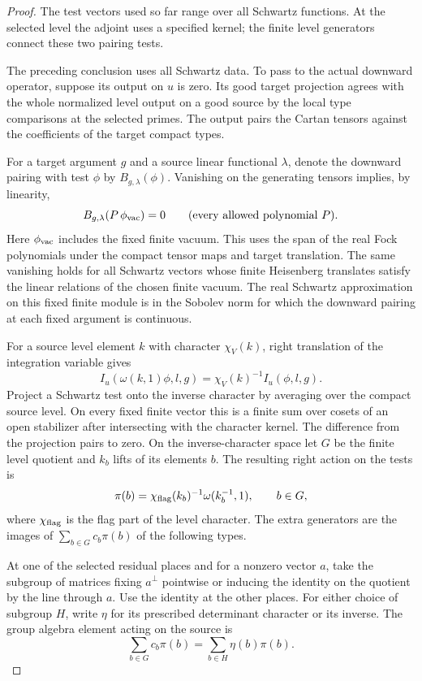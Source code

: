 \begin{proof}
The test vectors used so far range over all Schwartz functions. At the selected level the adjoint uses a specified kernel; the finite level generators connect these two pairing tests.

The preceding conclusion uses all Schwartz data. To pass
to the actual downward operator, suppose its output on
\(u\) is zero. Its good target projection agrees with the
whole normalized level output on a good source by the
local type comparisons at the selected primes. The
output pairs the Cartan tensors against the coefficients
of the target compact types.

For a target argument \(g\) and a source linear functional \(\lambda\), denote the downward pairing with test \(\phi\) by \(B_{g,\lambda}(\phi)\). Vanishing on the generating tensors implies, by linearity,
\[
 B_{g,\lambda}(P\,\phi_{\rm vac})=0\qquad(\text{every allowed polynomial }P).
\]
Here \(\phi_{\rm vac}\) includes the fixed finite vacuum.
This uses the span of the real Fock polynomials under the
compact tensor maps and target translation. The same
vanishing holds for all Schwartz vectors whose finite
Heisenberg translates satisfy the linear relations of
the chosen finite vacuum. The real Schwartz approximation
on this fixed finite module is in the Sobolev norm for
which the downward pairing at each fixed argument is
continuous.

For a source level element \(k\) with character \(\chi_V(k)\),
right translation of the integration variable gives
\[
 I_u(\omega(k,1)\phi,l,g)=\chi_V(k)^{-1}I_u(\phi,l,g).
\]
Project a Schwartz test onto the inverse character by
averaging over the compact source level. On every fixed
finite vector this is a finite sum over cosets of an open
stabilizer after intersecting with the character kernel.
The difference from the projection pairs to zero. On the
inverse-character space let \(G\) be the finite level
quotient and \(k_b\) lifts of its elements \(b\). The resulting right action on the tests is
\[
 \pi(b)=\chi_{\rm flag}(k_b)^{-1}\omega(k_b^{-1},1),\qquad b\in G,
\]
where \(\chi_{\rm flag}\) is the flag part of the level character. The extra generators are the images of
\(\sum_{b\in G}c_b\pi(b)\) of the following types.

At one
of the selected residual places and for a nonzero vector
\(a\), take the subgroup of matrices fixing \(a^\perp\)
pointwise or inducing the identity on the quotient by
the line through \(a\). Use the identity at the other
places. For either choice of subgroup \(H\), write \(\eta\) for its prescribed determinant character or its inverse. The group algebra element acting on the source is
\[
 \sum_{b\in G}c_b\pi(b)=\sum_{b\in H}\eta(b)\pi(b).
\]


\end{proof}
